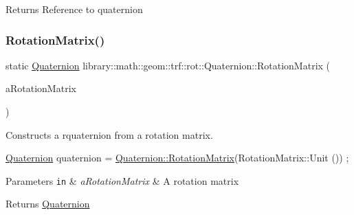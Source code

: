 \begin{DoxyReturn}{Returns}
Reference to quaternion 
\end{DoxyReturn}
\mbox{\label{classlibrary_1_1math_1_1geom_1_1trf_1_1rot_1_1_quaternion_af90f6ceb1d4840732eebceaa31143476}} 
\subsubsection{\texorpdfstring{Rotation\+Matrix()}{RotationMatrix()}}
{\footnotesize\ttfamily static \hyperlink{classlibrary_1_1math_1_1geom_1_1trf_1_1rot_1_1_quaternion}{Quaternion} library\+::math\+::geom\+::trf\+::rot\+::\+Quaternion\+::\+Rotation\+Matrix (\begin{DoxyParamCaption}\item[{const rot\+::\+Rotation\+Matrix \&}]{a\+Rotation\+Matrix }\end{DoxyParamCaption})\hspace{0.3cm}{\ttfamily [static]}}



Constructs a rquaternion from a rotation matrix. 


\begin{DoxyCode}
\hyperlink{classlibrary_1_1math_1_1geom_1_1trf_1_1rot_1_1_quaternion_aa7f459a08f5af38b9f7676a6bf36a21c}{Quaternion} quaternion = \hyperlink{classlibrary_1_1math_1_1geom_1_1trf_1_1rot_1_1_quaternion_af90f6ceb1d4840732eebceaa31143476}{Quaternion::RotationMatrix}(RotationMatrix::Unit
      ()) ;
\end{DoxyCode}



\begin{DoxyParams}[1]{Parameters}
\mbox{\tt in}  & {\em a\+Rotation\+Matrix} & A rotation matrix \\
\hline
\end{DoxyParams}
\begin{DoxyReturn}{Returns}
\hyperlink{classlibrary_1_1math_1_1geom_1_1trf_1_1rot_1_1_quaternion}{Quaternion} 
\end{DoxyReturn}
\mbox{\label{classlibrary_1_1math_1_1geom_1_1trf_1_1rot_1_1_quaternion_a0580b35480348ca136deb7e295043d69}} 
